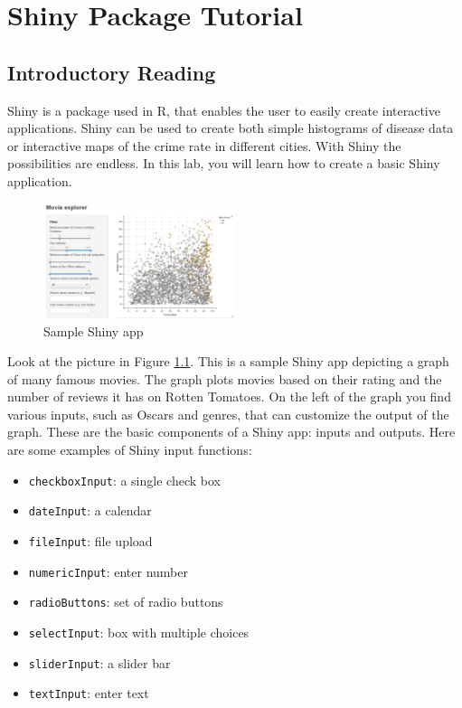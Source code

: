 \chapter{Shiny Package Tutorial}
\section{Introductory Reading}

Shiny is a package used in R, that enables the user to easily create interactive applications.
Shiny can be used to create both simple histograms of disease data or interactive maps of the crime rate in different cities.
With Shiny the possibilities are endless.
In this lab, you will learn how to create a basic Shiny application. 
\begin{figure}
   \centering
   \includegraphics[width = 0.5\textwidth]{pictures/shiny/shiny.PNG} 
   \caption{Sample Shiny app}
   \label{fig:sampleapp}
\end{figure}
\noindent Look at the picture in Figure \ref{fig:sampleapp}.
\cite{gallery} This is a sample Shiny app depicting a graph of many famous movies.
The graph plots movies based on their rating and the number of reviews it has on Rotten Tomatoes.
On the left of the graph you find various inputs, such as Oscars and genres, that can customize the output of the graph.
These are the basic components of a Shiny app: inputs and outputs.     
Here are some examples of Shiny input functions:
\begin{itemize}
    \item \texttt{checkboxInput}: a single check box
    \item \texttt{dateInput}: a calendar
    \item \texttt{fileInput}: file upload
    \item \texttt{numericInput}: enter number
    \item \texttt{radioButtons}: set of radio buttons
    \item \texttt{selectInput}: box with multiple choices
    \item \texttt{sliderInput}: a slider bar
    \item \texttt{textInput}: enter text
\end{itemize}
